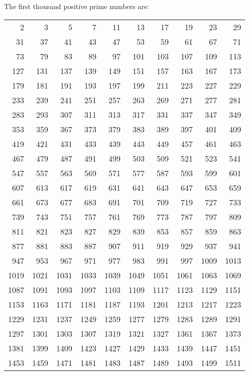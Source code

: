 \documentclass[12pt]{article}
\begin{document}
The first thousand positive prime numbers are:

\begin{tabular}{rrrrrrrrrr}
2 & 3 & 5 & 7 & 11 & 13 & 17 & 19 & 23 & 29 \\
31 & 37 & 41 & 43 & 47 & 53 & 59 & 61 & 67 & 71 \\
73 & 79 & 83 & 89 & 97 & 101 & 103 & 107 & 109 & 113 \\
127 & 131 & 137 & 139 & 149 & 151 & 157 & 163 & 167 & 173 \\
179 & 181 & 191 & 193 & 197 & 199 & 211 & 223 & 227 & 229 \\
233 & 239 & 241 & 251 & 257 & 263 & 269 & 271 & 277 & 281 \\
283 & 293 & 307 & 311 & 313 & 317 & 331 & 337 & 347 & 349 \\
353 & 359 & 367 & 373 & 379 & 383 & 389 & 397 & 401 & 409 \\
419 & 421 & 431 & 433 & 439 & 443 & 449 & 457 & 461 & 463 \\
467 & 479 & 487 & 491 & 499 & 503 & 509 & 521 & 523 & 541 \\
547 & 557 & 563 & 569 & 571 & 577 & 587 & 593 & 599 & 601 \\
607 & 613 & 617 & 619 & 631 & 641 & 643 & 647 & 653 & 659 \\
661 & 673 & 677 & 683 & 691 & 701 & 709 & 719 & 727 & 733 \\
739 & 743 & 751 & 757 & 761 & 769 & 773 & 787 & 797 & 809 \\
811 & 821 & 823 & 827 & 829 & 839 & 853 & 857 & 859 & 863 \\
877 & 881 & 883 & 887 & 907 & 911 & 919 & 929 & 937 & 941 \\
947 & 953 & 967 & 971 & 977 & 983 & 991 & 997 & 1009 & 1013 \\
1019 & 1021 & 1031 & 1033 & 1039 & 1049 & 1051 & 1061 & 1063 & 1069 \\
1087 & 1091 & 1093 & 1097 & 1103 & 1109 & 1117 & 1123 & 1129 & 1151 \\
1153 & 1163 & 1171 & 1181 & 1187 & 1193 & 1201 & 1213 & 1217 & 1223 \\
1229 & 1231 & 1237 & 1249 & 1259 & 1277 & 1279 & 1283 & 1289 & 1291 \\
1297 & 1301 & 1303 & 1307 & 1319 & 1321 & 1327 & 1361 & 1367 & 1373 \\
1381 & 1399 & 1409 & 1423 & 1427 & 1429 & 1433 & 1439 & 1447 & 1451 \\
1453 & 1459 & 1471 & 1481 & 1483 & 1487 & 1489 & 1493 & 1499 & 1511 \\

\end{tabular}
\end{document}

